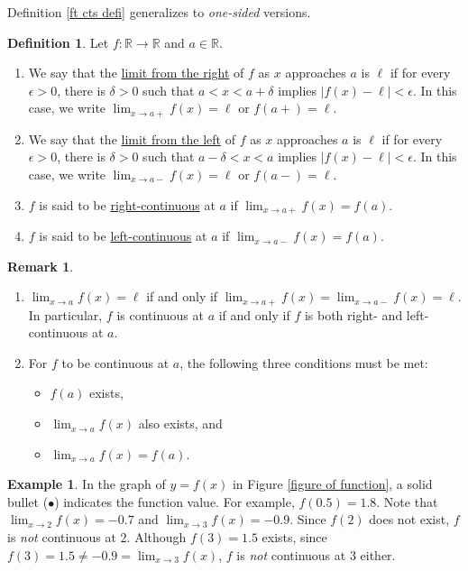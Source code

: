 \documentclass[12pt,letterpaper]{book}
\numberwithin{equation}{section}
\theoremstyle{definition}
\newtheorem{defi}[thm]{\textbf{Definition}}
\newtheorem{example}[thm]{\textbf{Example}}
\newtheorem{remark}[thm]{\textbf{Remark}}
\begin{document}
Definition \ref{ft cts defi} generalizes to \textit{one-sided} versions.

\begin{defi}
Let $f:\mathbb{R}\to \mathbb{R}$ and $a\in \mathbb{R}$.
\begin{enumerate}
\item We say that the \underline{limit from the right} of $f$ as $x$ approaches $a$ is $\ell$ if for every $\epsilon>0$, there is $\delta>0$ such that
$a<x<a+\delta$ implies $|f(x)-\ell|<\epsilon$. In this case, we write $\displaystyle{\lim_{x\to a+} f(x)=\ell}$ or $f(a+)=\ell$.
\item We say that the \underline{limit from the left} of $f$ as $x$ approaches $a$ is $\ell$ if for every $\epsilon>0$, there is $\delta>0$ such that
$a-\delta<x<a$ implies $|f(x)-\ell|<\epsilon$. In this case, we write $\displaystyle{\lim_{x\to a-} f(x)=\ell}$  or $f(a-)=\ell$.
\item $f$ is said to be \underline{right-continuous} at $a$ if $\displaystyle{\lim_{x\to a+} f(x)=f(a)}$.
\item $f$ is said to be \underline{left-continuous} at $a$ if $\displaystyle{\lim_{x\to a-} f(x)=f(a)}$.
\end{enumerate}
\end{defi}

\begin{remark}\quad
\begin{enumerate}
\item $\displaystyle{\lim_{x\to a} f(x)=\ell}$ if and only if $\displaystyle{\lim_{x\to a+} f(x)=\lim_{x\to a-} f(x)=\ell}$. In particular, $f$ is continuous at $a$ if and only if $f$ is both right- and left-continuous at $a$.
\item For $f$ to be continuous at $a$, the following three conditions must be met:
\begin{itemize}
\item $f(a)$ exists,
\item $\displaystyle{\lim_{x\to a} f(x)}$ also exists, and
\item $\displaystyle{\lim_{x\to a} f(x)=f(a)}$.
\end{itemize}
\end{enumerate}
\end{remark}

\begin{example} In the graph of $y=f(x)$ in Figure \ref{figure of function}, a solid bullet ($\bullet$) indicates the function value. For example, $f(0.5)=1.8$. Note that $\displaystyle{\lim_{x\to 2}f(x)}=-0.7$ and $\displaystyle{\lim_{x\to 3}f(x)}=-0.9$. Since $f(2)$ does not exist, $f$ is \textit{not} continuous at $2$. Although $f(3)=1.5$ exists, since $f(3)=1.5 \neq -0.9=\displaystyle{\lim_{x\to 3}f(x)}$, $f$ is \textit{not} continuous at $3$ either.
\end{example}
\end{document}
